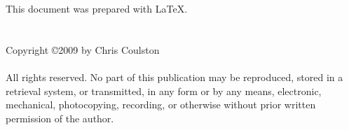 This document was prepared with \LaTeX.
\\
\\
\\

Copyright \copyright  2009 by Chris Coulston
\\
\\

All rights reserved.  No part of this publication may be reproduced, 
stored in a retrieval system, or transmitted, in any form or by any
means, electronic, mechanical, photocopying, recording, or otherwise
without prior written permission of the author.
